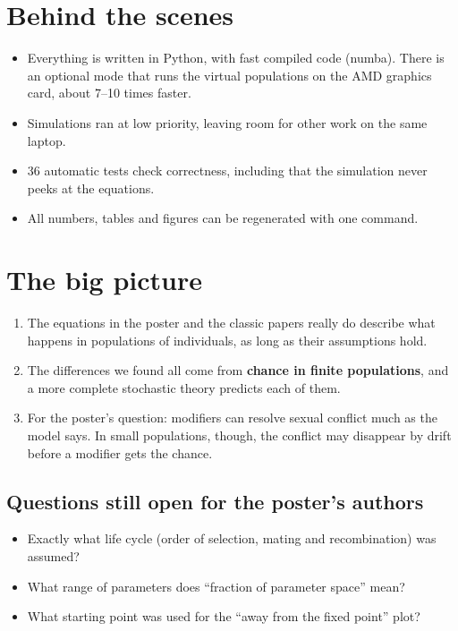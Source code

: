 \documentclass[11pt,a4paper]{article}
\begin{document}
\section{Behind the scenes}
\begin{itemize}
\item Everything is written in Python, with fast compiled code (numba). There is an optional mode that runs the virtual populations on the AMD graphics card, about 7--10 times faster.
\item Simulations ran at low priority, leaving room for other work on the same laptop.
\item 36 automatic tests check correctness, including that the simulation never peeks at the equations.
\item All numbers, tables and figures can be regenerated with one command.
\end{itemize}

\section{The big picture}
\begin{enumerate}
\item The equations in the poster and the classic papers really do describe what happens in populations of individuals, as long as their assumptions hold.
\item The differences we found all come from \textbf{chance in finite populations}, and a more complete stochastic theory predicts each of them.
\item For the poster's question: modifiers can resolve sexual conflict much as the model says. In small populations, though, the conflict may disappear by drift before a modifier gets the chance.
\end{enumerate}

\subsection*{Questions still open for the poster's authors}
\begin{itemize}
\item Exactly what life cycle (order of selection, mating and recombination) was assumed?
\item What range of parameters does ``fraction of parameter space'' mean?
\item What starting point was used for the ``away from the fixed point'' plot?
\end{itemize}
\end{document}
